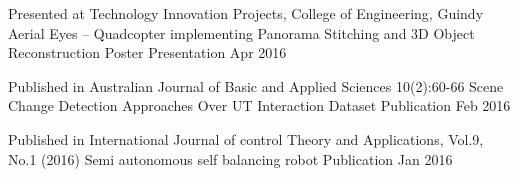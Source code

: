 

\begin{cventries}
  \cventry
    {Presented at Technology Innovation Projects, College of Engineering, Guindy} %
    {Aerial Eyes – Quadcopter implementing Panorama Stitching and 3D Object Reconstruction} %
    {Poster Presentation} %
    {Apr 2016} %
    {}


      \vspace{-1mm}
  \cventry
    {Published in Australian Journal of Basic and Applied Sciences 10(2):60-66} %
    {Scene Change Detection Approaches Over UT Interaction Dataset} %
    {Publication}
    {Feb 2016} %
    {}

      \vspace{-1mm}
  \cventry
    {Published in International Journal of control Theory and Applications, Vol.9, No.1 (2016)} %
    {Semi autonomous self balancing robot} %
    {Publication} %
    {Jan 2016} %
    {}

\end{cventries}
